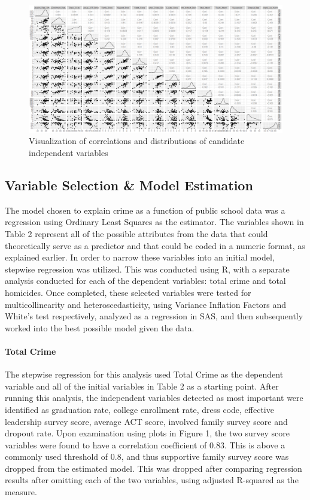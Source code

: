 \documentclass[12pt]{article}
\begin{document}
	\begin{figure}[h]
		\includegraphics[scale=.33]{pairplot.png}
		\caption{Visualization of correlations and distributions of candidate independent variables}
	\end{figure}

\subsection{Variable Selection \& Model Estimation}

The model chosen to explain crime as a function of public school data was a regression using Ordinary Least Squares as the estimator.  The variables shown in Table 2 represent all of the possible attributes from the data that could theoretically serve as a predictor and that could be coded in a numeric format, as explained earlier.  In order to narrow these variables into an initial model, stepwise regression was utilized.  This was conducted using R, with a separate analysis conducted for each of the dependent variables:  total crime and total homicides.  Once completed, these selected variables were tested for multicollinearity and heteroscedasticity, using Variance Inflation Factors and White's test respectively, analyzed as a regression in SAS, and then subsequently worked into the best possible model given the data.

\paragraph{Total Crime}

The stepwise regression for this analysis used Total Crime as the dependent variable and all of the initial variables in Table 2 as a starting point.  After running this analysis, the independent variables detected as most important were identified as graduation rate, college enrollment rate, dress code, effective leadership survey score, average ACT score, involved family survey score and dropout rate.  Upon examination using plots in Figure 1, the two survey score variables were found to have a correlation coefficient of 0.83.  This is above a commonly used threshold of 0.8, and thus supportive family survey score was dropped from the estimated model.  This was dropped after comparing regression results after omitting each of the two variables, using adjusted R-squared as the measure.
\end{document}
